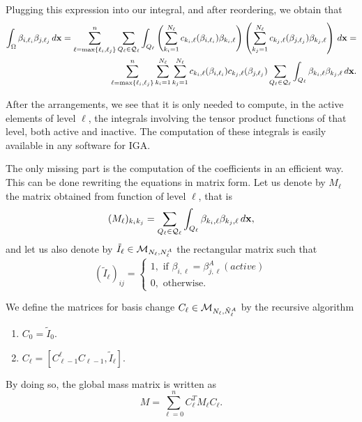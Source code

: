 \documentclass[a4paper]{siamltex1213}
\newcommand\QQ{\mathcal Q}
\newcommand{\bx}{{\bf x}}
\begin{document}
Plugging this expression into our integral, and after reordering, we obtain that 
\begin{align*}
\int_\Omega \beta_{i,\ell_i} \beta_{j,\ell_j} \, d\bx = \sum_{\ell = \max\{\ell_i, \ell_j\}}^n \sum_{Q_\ell \in \QQ_\ell}  \int_{Q_\ell} \left(\sum_{k_i=1}^{N_\ell} c_{k_i,\ell}(\beta_{i,\ell_i}) \beta_{k_i,\ell}\right) \left(\sum_{k_j=1}^{N_\ell} c_{k_j,\ell}(\beta_{j,\ell_j}) \beta_{k_j,\ell}\right) \, d\bx = \\
\sum_{\ell = \max\{\ell_i, \ell_j\}}^n \sum_{k_i=1}^{N_\ell} \sum_{k_j=1}^{N_\ell} c_{k_i,\ell}(\beta_{i,\ell_i}) c_{k_j,\ell}(\beta_{j,\ell_j}) \sum_{Q_\ell \in \QQ_\ell}  \int_{Q_\ell}  \beta_{k_i,\ell}  \beta_{k_j,\ell} \, d\bx.
\end{align*}

After the arrangements, we see that it is only needed to compute, in the active elements of level $\ell$, the integrals involving the tensor product functions of that level, both active and inactive. The computation of these integrals is easily available in any software for IGA. 

The only missing part is the computation of the coefficients in an efficient way. This can be done rewriting the equations in matrix form. Let us denote by $M_\ell$ the matrix obtained from function of level $\ell$, that is
\begin{equation*}
(M_\ell)_{k_i k_j} = \sum_{Q_\ell \in \QQ_\ell}  \int_{Q_\ell}  \beta_{k_i,\ell}  \beta_{k_j,\ell} \, d\bx,
\end{equation*}
and let us also denote by $\tilde I_\ell \in {\cal M}_{N_\ell, N^A_\ell}$ the rectangular matrix such that 
$$
(\tilde I_\ell)_{ij} = \left \{ 
\begin{array}{l}
1, \text{ if }  \beta_{i,\ell} = \beta^A_{j,\ell} (active)\\
0, \text{ otherwise. }
\end{array}
\right.$$

We define the matrices for basis change $C_\ell \in {\cal M}_{N_\ell, \tilde N^A_\ell}$ by the recursive algorithm
\begin{enumerate}
\item $C_0 = \tilde I_0$.
\item $C_\ell = [C_{\ell-1}^\ell C_{\ell-1}, \tilde I_\ell]$.
\end{enumerate}

By doing so, the global mass matrix is written as
\begin{equation*}
M = \sum_{\ell = 0}^n C^T_\ell M_\ell C_\ell.
\end{equation*}
\end{document}
